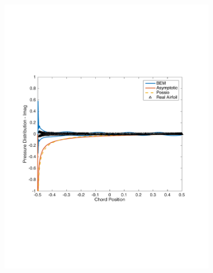 \documentclass{article}
\begin{document}
\begin{figure}[h]
\begin{subfigure}{0.3\textwidth}
	\includegraphics[width = \textwidth, height=0.2\textheight]{pressure_k20imag}
\end{subfigure}%
\begin{subfigure}{0.33\textwidth}
	\centering

\end{subfigure}
\end{figure}
\end{document}
